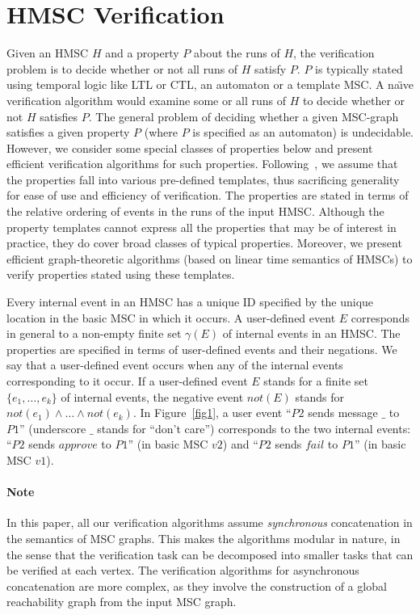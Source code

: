 \documentclass{entcs}
\begin{document}
\section{HMSC Verification}\label{hmscveri}

Given an HMSC $H$ and a property $P$ about the runs of 
$H$, the verification problem is to decide whether or 
not all runs of $H$ satisfy $P$. $P$ is typically 
stated using temporal logic like LTL or CTL, an 
automaton or a template MSC. A na{\"\i}ve verification 
algorithm would examine some or all runs of $H$ to 
decide whether or not $H$ satisfies $P$. The general 
problem of deciding whether a given MSC-graph satisfies 
a given property $P$ (where $P$ is specified as an 
automaton) is undecidable\cite{AlurYannakakis99}. However, we consider 
some special classes of properties below and present 
efficient verification algorithms for such properties. 
Following~\cite{patterns-spec,model-checking-managers,BVP02}, we assume that the properties fall 
into various pre-defined templates, thus sacrificing 
generality for ease of use and efficiency of verification. 
The properties are stated in terms of the relative 
ordering of events in the runs of the input HMSC. 
Although the property templates cannot express all the 
properties that may be of interest in practice, they 
do cover broad classes of typical properties. Moreover, 
we present efficient graph-theoretic algorithms (based 
on linear time semantics of HMSCs) to verify properties 
stated using these templates. 

Every internal event in an HMSC has a unique ID 
specified by the unique location in the basic MSC in 
which it occurs. A user-defined event $E$ corresponds 
in general to a non-empty finite set $\gamma(E)$ of 
internal events in an HMSC. The properties are specified 
in terms of user-defined events and their negations. 
We say that a user-defined event occurs when any of 
the internal events corresponding to it occur. If a 
user-defined event $E$ stands for a finite set 
$\{e_1,\ldots,e_k\}$ of internal events, the negative event 
$not(E)$ stands for $not(e_1) \wedge \ldots \wedge not(e_k)$. 
In Figure~\ref{fig1}, a user event ``$P2$ sends message $\_$ to $P1$'' 
(underscore $\_$ stands for ``don't care'') corresponds 
to the two internal events: ``$P2$ sends $approve$ to $P1$'' 
(in basic MSC $v2$) and ``$P2$ sends $fail$ to $P1$'' 
(in basic MSC $v1$).

\paragraph{Note} In this paper, all our verification algorithms assume
\emph{synchronous} concatenation in the semantics of MSC graphs. This makes the algorithms
modular in nature, in the sense that the verification task can be decomposed into
smaller tasks that can be verified at each vertex. The verification algorithms for
asynchronous concatenation are more complex, as they involve the construction of a global
reachability graph from the input MSC graph.
\end{document}
